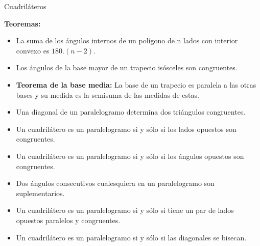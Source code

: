\documentclass[•]{article}
\begin{document}
\begin{center}
\large{Cuadriláteros}
\end{center}

\begin{flushleft}
	\textbf{Teoremas:}
	\begin{itemize}
		\item La suma de los \'angulos internos de un pol\'igono de n lados con interior convexo es $180 . (n-2)$.
		\item Los \'angulos de la base mayor de un trapecio is\'osceles son congruentes.
		\item \textbf{Teorema de la base media: } La base de un trapecio es paralela a las otras bases y su medida es la semisuma de las medidas de estas.
		\item Una diagonal de un paralelogramo determina dos tri\'angulos congruentes.
		\item Un cuadril\'atero es un paralelogramo si y s\'olo si los lados opuestos son congruentes.
		\item Un cuadril\'atero es un paralelogramo si y s\'olo si los \'angulos opuestos son congruentes.
		\item Dos \'angulos consecutivos cualesquiera en un paralelogramo son suplementarios.
		\item Un cuadril\'atero es un paralelogramo si y s\'olo si tiene un par de lados opuestos paralelos y congruentes.
		\item Un cuadril\'atero es un paralelogramo si y s\'olo si las diagonales se bisecan.
	\end{itemize}



\end{flushleft}
\end{document}
